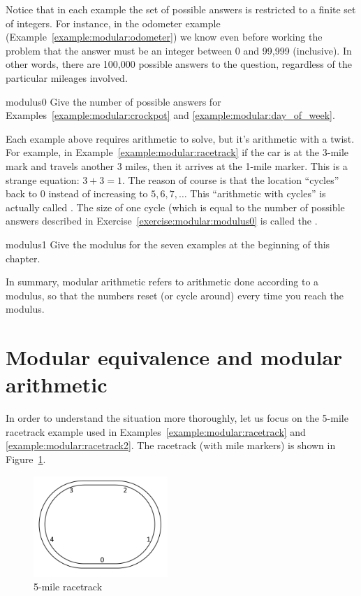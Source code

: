 Notice that in each example the set of possible answers is restricted to a finite set of integers. For instance, in the odometer example (Example~\ref{example:modular:odometer}) we know even before working the problem that the answer must be an integer between 0 and 99,999 (inclusive). In other words, there are 100,000 possible answers to the question, regardless of the particular mileages involved. 

\begin{exercise}{modulus0}
Give the number of possible answers for Examples~\ref{example:modular:crockpot} and \ref{example:modular:day_of_week}.
\end{exercise}

Each example above requires arithmetic to solve, but it's arithmetic with a twist. For example, in
Example~\ref{example:modular:racetrack} if the car is at the 3-mile mark and travels another 3 miles, then it arrives at the 1-mile marker. This is a strange equation: $3 + 3 = 1$. The reason of course is that the location ``cycles'' back to 0 instead of increasing to $5,6,7, \ldots$ This  ``arithmetic with cycles''  is actually called .  The size of one cycle (which is equal to the number of possible answers described in Exercise~\ref{exercise:modular:modulus0} is called the .  

\begin{exercise}{modulus1}
Give the modulus for the seven examples at the beginning of this chapter.
\end{exercise}

In summary, modular arithmetic refers to  arithmetic done according to a modulus, so that the numbers reset (or cycle around) every time you reach the modulus.

\section{Modular equivalence and modular arithmetic}\label{sec:ModEquiv}

In order to understand the situation more thoroughly, let us focus on the 5-mile racetrack example used in Examples~\ref{example:modular:racetrack} and \ref{example:modular:racetrack2}. The racetrack (with mile markers) is shown in Figure~\ref{fig:racetrack}. 
\begin{figure}[h]
\begin{center}
\includegraphics[width=2in]{images/racetrack.png}
\end{center}
\caption{5-mile racetrack}\label{fig:racetrack}
\end{figure}

